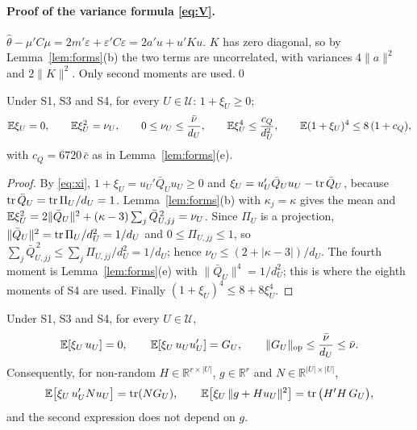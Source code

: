 \paragraph{Proof of the variance formula \eqref{eq:V}.} $\hat\theta-\mu'C\mu=2m'\varepsilon+\varepsilon'C\varepsilon=2a'u+u'Ku$. $K$ has zero diagonal, so by
Lemma~\ref{lem:forms}(b) the two terms are uncorrelated, with variances $4\|a\|^2$ and $2\|K\|^2$. Only second moments are used.\qed

\begin{lemma}[Moments of $\xi_U$]\label{lem:xi}
Under S1, S3 and S4, for every $U\in\mathcal{U}$: $1+\xi_U\ge0$;
\[
\mathbb{E}\xi_U=0,\qquad \mathbb{E}\xi_U^2=\nu_U,\qquad 0\le\nu_U\le\frac{\bar\nu}{d_U},\qquad
\mathbb{E}\xi_U^4\le\frac{c_Q}{d_U^2},\qquad \mathbb{E}(1+\xi_U)^4\le8\,(1+c_Q),
\]
with $c_Q=6720\,\bar c$ as in Lemma~\ref{lem:forms}(e).
\end{lemma}

\begin{proof}
By \eqref{eq:xi}, $1+\xi_U=u_U'\bar Q_Uu_U\ge0$ and $\xi_U=u_U'\bar Q_Uu_U-\operatorname{tr}\bar Q_U$, because
$\operatorname{tr}\bar Q_U=\operatorname{tr}\Pi_U/d_U=1$. Lemma~\ref{lem:forms}(b) with $\kappa_j=\kappa$ gives the mean and
$\mathbb{E}\xi_U^2=2\|\bar Q_U\|^2+(\kappa-3)\sum_j\bar Q_{U,jj}^{\,2}=\nu_U$. Since $\Pi_U$ is a projection,
$\|\bar Q_U\|^2=\operatorname{tr}\Pi_U/d_U^2=1/d_U$ and $0\le\Pi_{U,jj}\le1$, so
$\sum_j\bar Q_{U,jj}^{\,2}\le\sum_j\Pi_{U,jj}/d_U^2=1/d_U$; hence $\nu_U\le(2+|\kappa-3|)/d_U$. The
fourth moment is Lemma~\ref{lem:forms}(e) with $\|\bar Q_U\|^4=1/d_U^2$; this is where the eighth
moments of S4 are used. Finally $(1+\xi_U)^4\le8+8\xi_U^4$.
\end{proof}

\begin{lemma}\label{lem:mixed}
Under S1, S3 and S4, for every $U\in\mathcal{U}$,
\[
\mathbb{E}[\xi_U\,u_U]=0,\qquad \mathbb{E}[\xi_U\,u_Uu_U']=G_U,\qquad \|G_U\|_{\mathrm{op}}\le\frac{\bar\nu}{d_U}\le\bar\nu .
\]
Consequently, for non-random $H\in\mathbb{R}^{r\times|U|}$, $g\in\mathbb{R}^{r}$ and
$N\in\mathbb{R}^{|U|\times|U|}$,
\begin{equation}\label{eq:condid}
\mathbb{E}\big[\xi_U\,u_U'Nu_U\big]=\operatorname{tr}(NG_U),\qquad
\mathbb{E}\big[\xi_U\,\|g+Hu_U\|^2\big]=\operatorname{tr}\big(H'H\,G_U\big),
\end{equation}
and the second expression does not depend on $g$.
\end{lemma}

